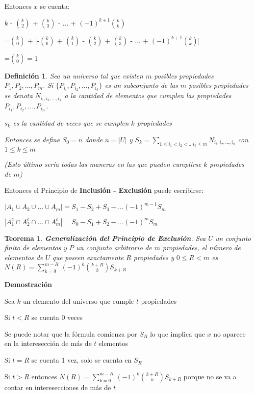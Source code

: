 \documentclass[a4paper,12pt]{report}
\newtheorem*{teo}{Teorema}
\newtheorem*{dfn}{Definición}
\begin{document}
Entonces $x$ se cuenta:

$k$ - $k\choose 2$ + $k\choose 3$ - $\dots$ + $(-1)^{k+1}$$k\choose k$

=$k\choose 0$ + [-$k\choose 0$ + $k\choose 1$ - $k\choose 2$ + $k\choose 3$ - $\dots$ + $(-1)^{k+1}$$k\choose k$]

=$k\choose 0$$=1$




\begin{dfn}
Sea un universo tal que existen $m$ posibles propiedades $P_1,P_2,\dots,P_m$. Si $\{P_{i_i},P_{i_2},\dots,P_{i_k}\}$ es un subconjunto de las $m$ posibles propiedades se denota 
$N_{i_i,i_2,\dots,i_k}$ a la cantidad de elementos que cumplen las propiedades 
$P_{i_1},P_{i_2},\dots,P_{i_m}$. 

$s_k$ es la cantidad de veces que se cumplen $k$ propiedades
 
Entonces se define $S_0=n$ donde $n=|U|$ y 
$S_k=\sum_{1\leq i_1 < i_2 < \dots i_k \leq m} N_{i_i,i_2,\dots,i_k}$ con $1\leq k \leq m$

(Esto último sería todas las maneras en las que pueden cumplirse $k$ propiedades de $m$)
\end{dfn}


Entonces el Principio de \textbf{Inclusión - Exclusión} puede escribirse:

$|A_1\cup A_2\cup \dots \cup A_m| = S_1 - S_2 + S_3 - \dots (-1)^{m-1}S_m$

$|A_1^c\cap A_2^c\cap \dots \cap A_m^c| = S_0 - S_1 + S_2 - \dots (-1)^{m}S_m$

\begin{teo}
 \textbf{Generalización del Principio de Exclusión}. Sea $U$ un conjunto finito de elementos y $P$ un conjunto arbitrario de $m$ propiedades, el número de elementos de $U$ que poseen exactamente $R$ propiedades y $0\leq R < m$ es
 $N(R) = \sum^{m-R}_{k=0}\, (-1)^k$${k+R}\choose{k}$$S_{k+R}$
\end{teo}

\textbf{Demostración}

Sea $k$ un elemento del universo que cumple $t$ propiedades

Si $t<R$ se cuenta 0 veces

Se puede notar que la fórmula comienza por $S_R$ lo que implica que $x$ no aparece en la interesección de más de $t$ elementos

Si $t=R$ se cuenta 1 vez, solo se cuenta en $S_R$

Si $t>R$ entonces $N(R) = \sum^{m-R}_{k=0}\, (-1)^k$${k+R}\choose{k}$$S_{k+R}$ porque no se va a contar en interesecciones de más de $t$
\end{document}
